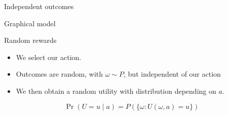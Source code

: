 \documentclass[smaller]{beamer}
\begin{document}
\begin{frame}[label={sec:org24d1c79}]{Independent outcomes}
\begin{block}{Graphical model}
\begin{center}
\end{center}
\end{block}

\begin{block}{Random rewards}
\begin{itemize}
\item We \alert{select} our action.
\item Outcomes are \alert{random}, with \(\omega \sim P\), but \alert{independent} of our action
\item We then obtain a random \alert{utility} with distribution depending on \(a\).
\end{itemize}
\[
\Pr(U = u \mid a) = P(\{\omega : U(\omega, a) = u\})
\]
\end{block}
\end{frame}
\end{document}
